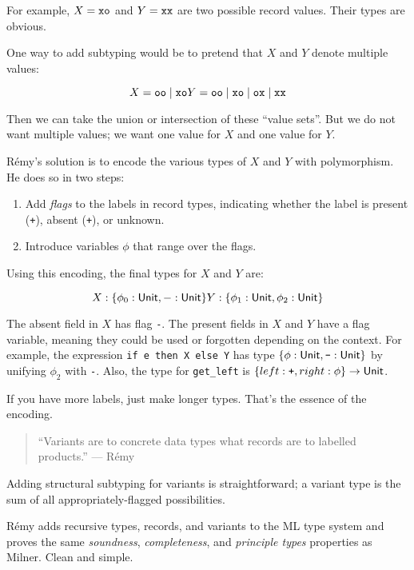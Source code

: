 \documentclass{article}
\begin{document}

For example, $X = {\tt xo}$ and $Y = {\tt xx}$ are two possible record values.
Their types are obvious.

One way to add subtyping would be to pretend that $X$ and $Y$ denote multiple values:

\[
  X = {\tt oo} \mid {\tt xo}
\\
  Y = {\tt oo} \mid {\tt xo} \mid {\tt ox} \mid {\tt xx}
\]

Then we can take the union or intersection of these ``value sets''.
But we do not want multiple values; we want one value for $X$ and one value for $Y$.

R\'{e}my's solution is to encode the various types of $X$ and $Y$ with polymorphism.
He does so in two steps:
\begin{enumerate}
\item
  Add \emph{flags} to the labels in record types, indicating whether the
  label is present ({\tt +}), absent ({\tt +}), or unknown.
\item
  Introduce variables $\phi$ that range over the flags.
\end{enumerate}

Using this encoding, the final types for $X$ and $Y$ are:

\[
  X : \{\phi_0 : \mathsf{Unit}, {\tt -} : \mathsf{Unit}\}
  \\
  Y : \{\phi_1 : \mathsf{Unit}, \phi_2 : \mathsf{Unit}\}
\]

The absent field in $X$ has flag {\tt -}.
The present fields in $X$ and $Y$ have a flag variable, meaning they could be
 used or forgotten depending on the context.
For example, the expression {\tt if e then X else Y} has type $\{\phi : \mathsf{Unit}, \texttt{-} : \mathsf{Unit}\}$
by unifying $\phi_2$ with {\tt -}.
Also, the type for {\tt get\_left} is $\{left : \texttt{+}, right : \phi \} \rightarrow \mathsf{Unit}$.

If you have more labels, just make longer types.
That's the essence of the encoding.

\begin{quote}
  ``Variants are to concrete data types what records are to labelled products.'' --- R\'{e}my
\end{quote}

Adding structural subtyping for variants is straightforward; a variant type is
 the sum of all appropriately-flagged possibilities.

R\'{e}my adds recursive types, records, and variants to the ML type system and
 proves the same \emph{soundness}, \emph{completeness}, and \emph{principle types}
 properties as Milner.
Clean and simple.
\end{document}
